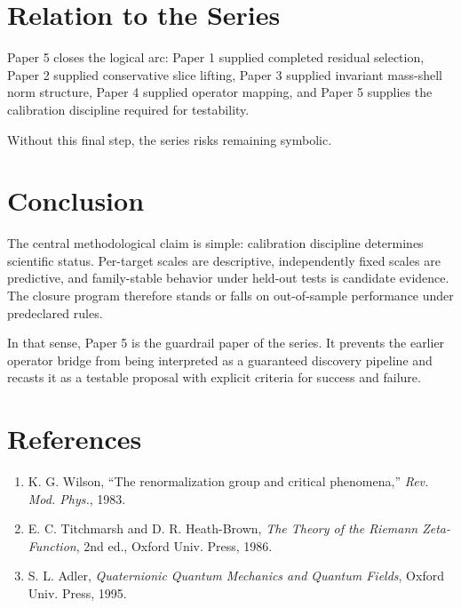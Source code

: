 \documentclass[11pt]{article}
\begin{document}
\section{Relation to the Series}
Paper 5 closes the logical arc: Paper 1 supplied completed residual selection, Paper 2 supplied conservative slice lifting, Paper 3 supplied invariant mass-shell norm structure, Paper 4 supplied operator mapping, and Paper 5 supplies the calibration discipline required for testability.

Without this final step, the series risks remaining symbolic.

\section{Conclusion}
The central methodological claim is simple: calibration discipline determines scientific status. Per-target scales are descriptive, independently fixed scales are predictive, and family-stable behavior under held-out tests is candidate evidence. The closure program therefore stands or falls on out-of-sample performance under predeclared rules.

In that sense, Paper 5 is the guardrail paper of the series. It prevents the earlier operator bridge from being interpreted as a guaranteed discovery pipeline and recasts it as a testable proposal with explicit criteria for success and failure.

\section*{References}
\begin{enumerate}
\item K. G. Wilson, ``The renormalization group and critical phenomena,'' \emph{Rev. Mod. Phys.}, 1983.
\item E. C. Titchmarsh and D. R. Heath-Brown, \emph{The Theory of the Riemann Zeta-Function}, 2nd ed., Oxford Univ. Press, 1986.
\item S. L. Adler, \emph{Quaternionic Quantum Mechanics and Quantum Fields}, Oxford Univ. Press, 1995.
\end{enumerate}
\end{document}
